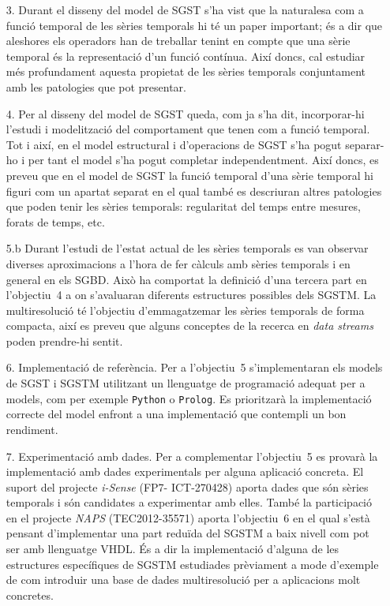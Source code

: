 \begin{itemize}

\item[3.] Durant el disseny del model de SGST s'ha vist que la
  naturalesa com a funció temporal de les sèries temporals hi té un
  paper important; és a dir que aleshores els operadors han de
  treballar tenint en compte que una sèrie temporal és la
  representació d'un funció contínua. Així doncs, cal estudiar més
  profundament aquesta propietat de les sèries temporals conjuntament
  amb les patologies que pot presentar. 


\item[4.] Per al disseny del model de SGST queda, com ja s'ha dit,
  incorporar-hi l'estudi i modelització del comportament que tenen com
  a funció temporal. Tot i així, en el model estructural i
  d'operacions de SGST s'ha pogut separar-ho i per tant el model s'ha
  pogut completar independentment. Així doncs, es preveu que en el
  model de SGST la funció temporal d'una sèrie temporal hi figuri com
  un apartat separat en el qual també es descriuran altres patologies
  que poden tenir les sèries temporals: regularitat del temps entre
  mesures, forats de temps, etc.


\item[5.b] Durant l'estudi de l'estat actual de les sèries temporals
  es van observar diverses aproximacions a l'hora de fer càlculs amb
  sèries temporals i en general en els SGBD. Això ha comportat la
  definició d'una tercera part en l'objectiu~4 a on s'avaluaran
  diferents estructures possibles dels SGSTM.  La multiresolució té
  l'objectiu d'emmagatzemar les sèries temporals de forma compacta,
  així es preveu que alguns conceptes de la recerca en \emph{data
    streams} poden prendre-hi sentit.



\item[6.] Implementació de referència. Per a l'objectiu~5 s'implementaran
  els models de SGST i SGSTM utilitzant un llenguatge de programació adequat
  per a models, com per exemple \texttt{Python} o \texttt{Prolog}.  Es
  prioritzarà la implementació correcte del model enfront a una
  implementació que contempli un bon rendiment. 


\item[7.] Experimentació amb dades. Per a complementar l'objectiu~5 es
  provarà la implementació amb dades experimentals per alguna
  aplicació concreta. El suport del projecte \emph{i-Sense} (FP7-
  ICT-270428) aporta dades que són sèries temporals i són candidates a
  experimentar amb elles.  També la participació en el projecte
  \emph{NAPS} (TEC2012-35571) aporta l'objectiu~6 en el qual s'està
  pensant d'implementar una part reduïda del SGSTM a baix nivell com
  pot ser amb llenguatge VHDL. És a dir la implementació d'alguna de
  les estructures específiques de SGSTM estudiades prèviament a mode
  d'exemple de com introduir una base de dades multiresolució per a
  aplicacions molt concretes.





\end{itemize}
